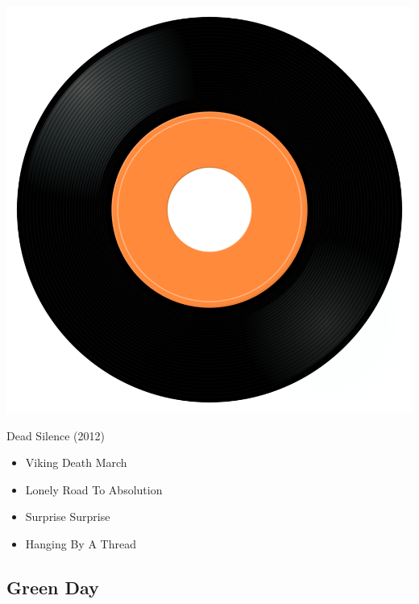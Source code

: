 \begin{minipage}[t]{0.25\textwidth}
\captionsetup{type=figure}
\includegraphics[width=\textwidth]{Images/cover.png}
\caption*{Dead Silence (2012)}
\end{minipage}
\begin{minipage}[t]{0.25\textwidth}\vspace{0pt}
\begin{itemize}[nosep,leftmargin=1em,labelwidth=*,align=left]
	\setlength{\itemsep}{0pt}
	\item Viking Death March
	\item Lonely Road To Absolution
	\item Surprise Surprise
	\item Hanging By A Thread
\end{itemize}
\end{minipage}

\subsection{Green Day}

